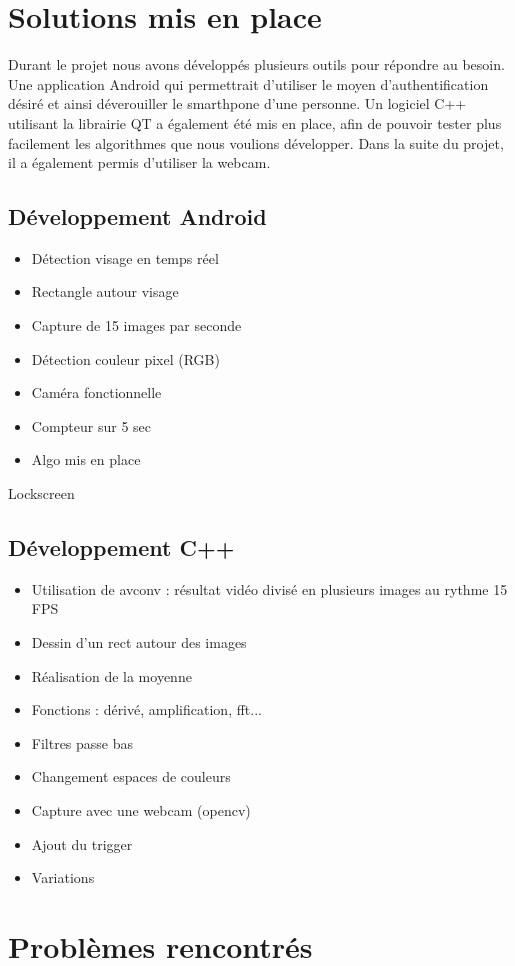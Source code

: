 \section{Solutions mis en place}

Durant le projet nous avons développés plusieurs outils pour répondre au besoin. Une application Android qui permettrait d'utiliser le moyen d'authentification désiré et ainsi déverouiller le smarthpone d'une
personne. Un logiciel C++ utilisant la librairie QT a également été mis en place, afin de pouvoir tester plus facilement les algorithmes que nous voulions développer. Dans la suite du projet, il a également
permis d'utiliser la webcam. 

\subsection{Développement Android}

\begin{itemize}
	\item Détection visage en temps réel
	\item Rectangle autour visage
	\item Capture de 15 images par seconde
	\item Détection couleur pixel (RGB)
	\item Caméra fonctionnelle
	\item Compteur sur 5 sec
	\item Algo mis en place  
\end{itemize}

Lockscreen

\subsection{Développement C++}

\begin{itemize}
 	\item Utilisation de avconv : résultat vidéo divisé en plusieurs images au rythme 15 FPS  
	\item Dessin d'un rect autour des images
	\item Réalisation de la moyenne
	\item Fonctions : dérivé, amplification, fft...
	\item Filtres passe bas 
	\item Changement espaces de couleurs
	\item Capture avec une webcam (opencv)
	\item Ajout du trigger 
	\item Variations
\end{itemize}

\section{Problèmes rencontrés}

